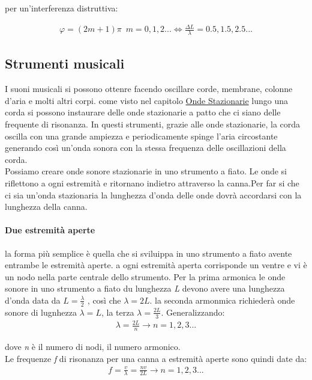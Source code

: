 \documentclass[a4paper,11pt]{article}
\begin{document}
per un'interferenza distruttiva:

\begin{align*}
    \varphi = (2m+1)\pi \, \, \, m = 0,1,2... \Longleftrightarrow \frac{\Delta L}{\lambda} = 0.5,1.5,2.5 ...
\end{align*}

\subsection{Strumenti musicali}

I suoni musicali si possono ottenre facendo oscillare corde, membrane, colonne d'aria e molti altri corpi. come visto nel capitolo \hyperref[sec:OndeStazionarie]{Onde Stazionarie} lungo una corda si possono instaurare delle onde stazionarie a patto che ci siano delle frequente di risonanza. In questi strumenti, grazie alle onde stazionarie, la corda oscilla con una grande ampiezza e periodicamente spinge l'aria circostante generando così un'onda sonora con la stessa frequenza delle oscillazioni della corda. 
\\
Possiamo creare onde sonore stazionarie in uno strumento a fiato. Le onde si riflettono a ogni estremità e ritornano indietro attraverso la canna.Per far si che ci sia un'onda stazionaria la lunghezza d'onda delle onde dovrà accordarsi con la lunghezza della canna. 
\paragraph{Due estremità aperte}
la forma più semplice è quella che si sviluippa in uno strumento a fiato avente entrambe le estremità aperte. a ogni estremità aperta corrisponde un ventre e vi è un nodo nella parte centrale dello strumento. Per la prima armonica le onde sonore in uno strumento a fiato du lunghezza \textit{L} devono avere una lunghezza d'onda data da \(L = \frac{\lambda}{2}\) , così che \(\lambda = 2L\).
la seconda armonmica richiederà onde sonore di lugnhezza \(\lambda = L\), la terza \(\lambda = \frac{2L}{3}\). Generalizzando:
\begin{align*}
    \lambda = \frac{2L}{n} \rightarrow n = 1,2,3... 
\end{align*}

dove \textit{n} è il numero di nodi, il numero armonico. 
\\
Le frequenze \textit{f} di risonanza per una canna a estremità aperte sono quindi date da: 
\begin{align*}
    f = \frac{v}{\lambda} = \frac{nv}{2L} \rightarrow n = 1,2,3...
\end{align*}
\end{document}
